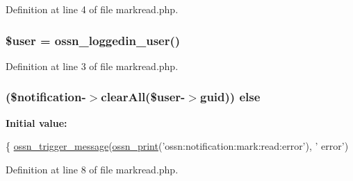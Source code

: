Definition at line 4 of file markread.\+php.

\subsubsection[{\texorpdfstring{\$user}{$user}}]{\setlength{\rightskip}{0pt plus 5cm}\${\bf user} = {\bf ossn\+\_\+loggedin\+\_\+user}()}\hypertarget{_ossn_notifications_2actions_2markread_8php_a598ca4e71b15a1313ec95f0df1027ca5}{}\label{_ossn_notifications_2actions_2markread_8php_a598ca4e71b15a1313ec95f0df1027ca5}


Definition at line 3 of file markread.\+php.

\subsubsection[{\texorpdfstring{else}{else}}]{ (\$notification-\/$>$clear\+All(\${\bf user}-\/$>$guid)) else}\hypertarget{_ossn_notifications_2actions_2markread_8php_a5eb027f9c791fd26d341031417e0d3e6}{}\label{_ossn_notifications_2actions_2markread_8php_a5eb027f9c791fd26d341031417e0d3e6}
{\bfseries Initial value\+:}
\begin{DoxyCode}
\{
    \hyperlink{ossn_8lib_8system_8php_ab3f23f23f32f50c12e7aea0ffaccaac7}{ossn\_trigger\_message}(\hyperlink{ossn_8lib_8languages_8php_a2be5d1c4b695593a9b9067b96df2150a}{ossn\_print}(\textcolor{stringliteral}{'ossn:notification:mark:read:error'}), \textcolor{stringliteral}{'
      error'})
\end{DoxyCode}


Definition at line 8 of file markread.\+php.

